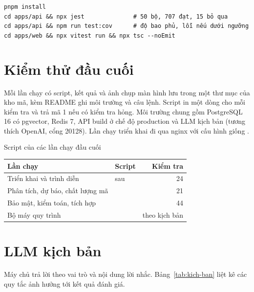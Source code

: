\begin{Verbatim}
pnpm install
cd apps/api && npx jest              # 50 bộ, 707 đạt, 15 bỏ qua
cd apps/api && npm run test:cov      # độ bao phủ, lỗi nếu dưới ngưỡng
cd apps/web && npx vitest run && npx tsc --noEmit
\end{Verbatim}

\section{Kiểm thử đầu cuối}

Mỗi lần chạy có script, kết quả và ảnh chụp màn hình lưu trong một thư mục  của kho mã, kèm README ghi môi trường và câu lệnh. Script in một dòng cho mỗi kiểm tra và trả mã 1 nếu có kiểm tra hỏng. Môi trường chung gồm PostgreSQL 16 có pgvector, Redis 7, API build ở chế độ production và LLM kịch bản  (tương thích OpenAI, cổng 20128). Lần chạy triển khai đi qua nginx với cấu hình giống .

\begin{table}{Script của các lần chạy đầu cuối}
\label{tab:e2e-script}
\small
\begin{tabularx}{\textwidth}{|L|P{6.2cm}|r|}
\hline
\textbf{Lần chạy} & \textbf{Script} & \textbf{Kiểm tra} \\ \hline
Triển khai và trình diễn &  sau  & 24 \\ \hline
Phân tích, dự báo, chất lượng mã &  & 21 \\ \hline
Bảo mật, kiểm toán, tích hợp &  & 44 \\ \hline
Bộ máy quy trình &  & theo kịch bản \\ \hline
\end{tabularx}
\end{table}

\section{LLM kịch bản}

Máy chủ trả lời theo vai trò và nội dung lời nhắc. Bảng~\ref{tab:kich-ban} liệt kê các quy tắc ảnh hưởng tới kết quả đánh giá.


